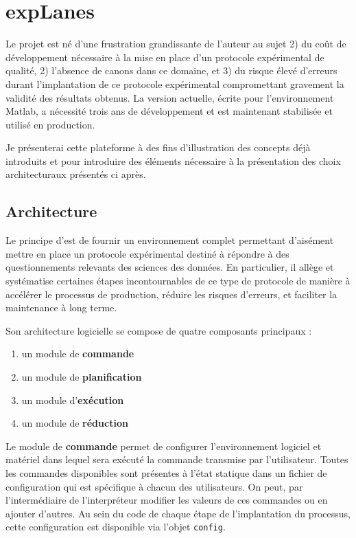 \section{\nmu expLanes} \label{sec:explanes}

Le projet \explanes est né d'une frustration grandissante de l'auteur au sujet 2) du coût de développement nécessaire à la mise en place d'un protocole expérimental de qualité, 2) l'absence de canons dans ce domaine, et 3) du risque élevé d'erreurs durant l'implantation de ce protocole expérimental compromettant gravement la validité des résultats obtenus. La version actuelle, écrite pour l'environnement \textsf{Matlab}\textsuperscript{\tiny\textregistered}, a nécessité trois ans de développement et est maintenant stabilisée et utilisé en production.

Je présenterai cette plateforme à des fins d'illustration des concepts déjà introduits et pour introduire des éléments nécessaire à la présentation des choix architecturaux présentés ci après.

\subsection{Architecture}

Le principe d'\explanes est de fournir un environnement complet permettant d'aisément mettre en place un protocole expérimental destiné à répondre à des questionnements relevants des sciences des données. En particulier, il allège et systématise certaines étapes incontournables de ce type de protocole de manière à accélérer le processus de production, réduire les risques d'erreurs, et faciliter la maintenance à long terme.

Son architecture logicielle se compose de quatre composants principaux :
\begin{enumerate}
  \item un module de \textbf{commande}
  \item un module de \textbf{planification}
  \item un module d'\textbf{exécution}
  \item un module de \textbf{réduction}
\end{enumerate}

Le module de \textbf{commande} permet de configurer l'environnement logiciel et matériel dans lequel sera exécuté la commande transmise par l'utilisateur. Toutes les commandes disponibles sont présentes à l'état statique dans un fichier de configuration qui est spécifique à chacun des utilisateurs. On peut, par l'intermédiaire de l'interpréteur modifier les valeurs de ces commandes ou en ajouter d'autres. Au sein du code de chaque étape de l'implantation du processus, cette configuration est disponible via l'objet \texttt{config}.

